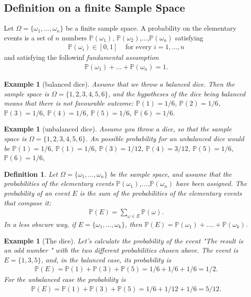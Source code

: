 \documentclass[12pt]{article}
\newtheorem{definition}[theorem]{Definition}
\newtheorem{example}[theorem]{Example}
\newcommand{\<}{{\langle \!\! \langle}}
\renewcommand{\>}{{\rangle \!\! \rangle}}
\newcommand{\bel}[2]{\begin{equation} \label{#1} \begin{split} #2
 					\end{split} \end{equation}}
\begin{document}
\subsection{Definition on a finite Sample Space}

Let $\Omega=\{\omega_1,...,\omega_n\}$ be a finite sample space. A probability on the elementary events
is a set of $n$ numbers $\mathbb{P}(\omega_1)$, $\mathbb{P}(\omega_2)$,...,$\mathbb{P}(\omega_n)$ satisfying 
\bel{e:pos}{\mathbb{P}(\omega_i)\in[0,1] & \textrm{ for every } i=1,...,n} 
and satisfying the followinf \emph{ fundamental assumption }
\bel{e:fun}{\mathbb{P}(\omega_1)+...+\mathbb{P}(\omega_n)=1.}

\begin{example}[balanced dice]
	Assume that we throw a balanced dice. Then the sample space is $\Omega=\{1,2,3,4,5,6\}$, and the hypotheses of the dice being balanced means that there is not favourable outcome:  $ \mathbb{P}(1)=1/6$, $ \mathbb{P}(2)=1/6$, $ \mathbb{P}(3)=1/6$, $ \mathbb{P}(4)=1/6$, $ \mathbb{P}(5)=1/6$, $ \mathbb{P}(6)=1/6$.
\end{example}
\begin{example}[unbalanced dice]
	Assume you throw a dice, so that the sample space is $\Omega=\{1,2,3,4,5,6\}$. An possible probability for an unbalanced dice would be $ \mathbb{P}(1)=1/6$,  $ \mathbb{P}(1)=1/6$, $ \mathbb{P}(3)=1/12$, $ \mathbb{P}(4)=3/12$, $ \mathbb{P}(5)=1/6$, $ \mathbb{P}(6)=1/6$,
\end{example}


\begin{definition}
	Let $\Omega =\{\omega_1,...,\omega_n\}$ be the sample space, and assume that the probabilities of the elementary events $\mathbb{P}(\omega_1)$,...,$\mathbb{P}(\omega_n)$ have been assigned. The probability of an event $E$ is the sum of the probabilities of the elementary events that compose it:
	\bel{d:prob}{\mathbb{P}(E)=\sum_{\omega\in E}\mathbb{P}(\omega).}
In a less obscure way, if $E=\{\omega_1,...,\omega_k\}$, then $\mathbb{P}(E)=\mathbb{P}(\omega_1)+....+\mathbb{P}(\omega_k)$. 
\end{definition}

	\begin{example}[The dice]
		Let's calculate the probability of the event "The result is an odd number " with the two different probabilities chosen above. The event is $ E=\{1,3,5\}$, and, in the balanced case, its probability is 
		\bel{}{\mathbb{P}(E)=\mathbb{P}(1)+\mathbb{P}(3)+\mathbb{P}(5)=1/6+1/6+1/6=1/2.}
		For the unbalanced case the probability is	
		\bel{}{\mathbb{P}(E)=\mathbb{P}(1)+\mathbb{P}(3)+\mathbb{P}(5)=1/6+1/12+1/6=5/12.}
		
	\end{example}
\end{document}
